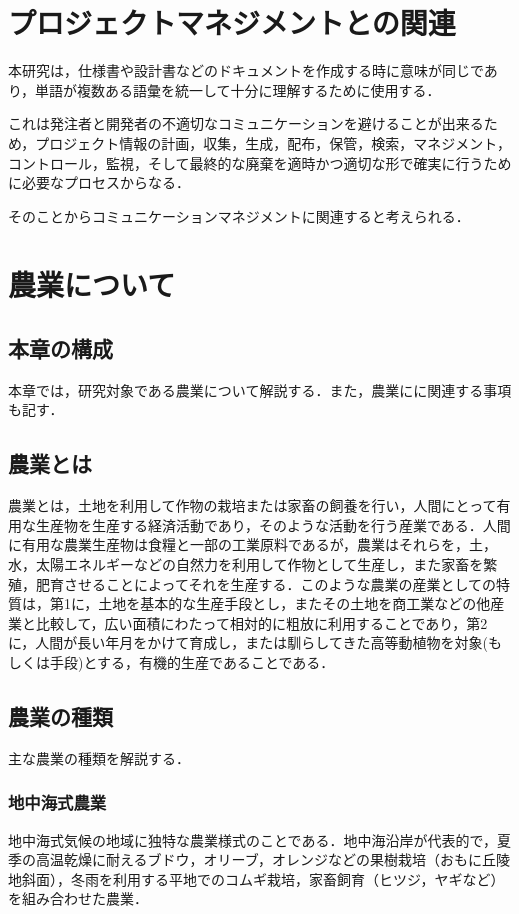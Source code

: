 \chapter{プロジェクトマネジメントとの関連}
本研究は，仕様書や設計書などのドキュメントを作成する時に意味が同じであり，単語が複数ある語彙を統一して十分に理解するために使用する．

これは発注者と開発者の不適切なコミュニケーションを避けることが出来るため，プロジェクト情報の計画，収集，生成，配布，保管，検索，マネジメント，コントロール，監視，そして最終的な廃棄を適時かつ適切な形で確実に行うために必要なプロセスからなる．

そのことからコミュニケーションマネジメントに関連すると考えられる．

\chapter{農業について}
\section{本章の構成}
本章では，研究対象である農業について解説する．また，農業にに関連する事項も記す．
\section{農業とは}
農業とは，土地を利用して作物の栽培または家畜の飼養を行い，人間にとって有用な生産物を生産する経済活動であり，そのような活動を行う産業である．人間に有用な農業生産物は食糧と一部の工業原料であるが，農業はそれらを，土，水，太陽エネルギーなどの自然力を利用して作物として生産し，また家畜を繁殖，肥育させることによってそれを生産する．このような農業の産業としての特質は，第1に，土地を基本的な生産手段とし，またその土地を商工業などの他産業と比較して，広い面積にわたって相対的に粗放に利用することであり，第2に，人間が長い年月をかけて育成し，または馴らしてきた高等動植物を対象(もしくは手段)とする，有機的生産であることである．\cite{nouwiki2015}
\section{農業の種類}
主な農業の種類を解説する．\cite{kotoba}

\subsection{地中海式農業}
地中海式気候の地域に独特な農業様式のことである．地中海沿岸が代表的で，夏季の高温乾燥に耐えるブドウ，オリーブ，オレンジなどの果樹栽培（おもに丘陵地斜面），冬雨を利用する平地でのコムギ栽培，家畜飼育（ヒツジ，ヤギなど）を組み合わせた農業．

